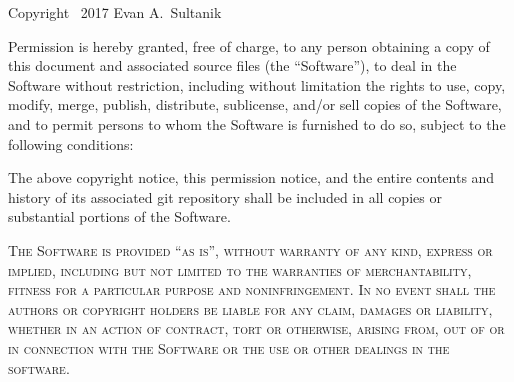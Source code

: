 \documentclass{article}
\begin{document}
Copyright \textcopyright\ 2017 Evan A.~Sultanik

Permission is hereby granted, free of charge, to any person obtaining a copy
of this document and associated source files (the ``Software''), to deal
in the Software without restriction, including without limitation the rights
to use, copy, modify, merge, publish, distribute, sublicense, and/or sell
copies of the Software, and to permit persons to whom the Software is
furnished to do so, subject to the following conditions:

The above copyright notice, this permission notice, and the entire
contents and history of its associated git repository shall be
included in all copies or substantial portions of the Software.

\textsc{The Software is provided ``as is'', without warranty of any kind, express or implied, including but not limited to the warranties of merchantability, fitness for a particular purpose and noninfringement. In no event shall the authors or copyright holders be liable for any claim, damages or liability, whether in an action of contract, tort or otherwise, arising from, out of or in connection with the Software or the use or other dealings in the software.}
\end{document}
